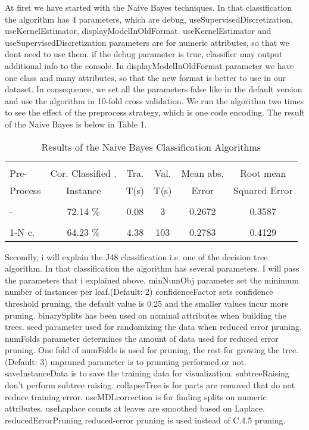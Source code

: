 \documentclass[a4paper]{article}
\begin{document}
At first we have started with the Naive Bayes techniques. In that classification the algorithm has 4 parameters, which are debug, useSupervisedDiscretization, useKernelEstimator, displayModelInOldFormat. useKernelEstimator and useSupervisedDiscretization parameters are for numeric attributes, so that we dont need to use them. if the debug parameter is true, classifier may output additional info to the console. In displayModelInOldFormat parameter we have one class and many attributes, so that the new format is better to use in our dataset. In consequence, we set all the parameters false like in the default version and use the algorithm in 10-fold cross validation. We run the algorithm two times to see the effect of the preprocess strategy, which is one code encoding. The result of the Naive Bayes is below in Table 1.

\begin{table}
\begin{tabular}{|l| c | c | c |c |c |}

\hline & & & & & \\
Pre- & Cor. Classified . & Tra. & Val. & Mean abs.  & Root mean \\
Process & Instance & T(s) &  T(s) & Error & Squared Error \\
\hline & & & & & \\
- &72.14  $\%$ & 0.08 & 3 &  0.2672 & 0.3587 \\ 
\hline & & & & & \\
1-N c. &64.23  $\%$ & 4.38 & 103 & 0.2783 & 0.4129 \\ 
\hline
\end{tabular}
\caption{Results of the Naive Bayes Classification Algorithms}
\end{table}

Secondly, i will explain the J48 classification i.e. one of the decision tree algorithm. In that classification the algorithm has several parameters. I will pass the parameters that i explained above. minNumObj parameter set the minimum number of instances per leaf.(Default: 2) confidenceFactor sets confidence threshold pruning, the default value is 0.25 and the smaller values incur more pruning. binarySplits has been used on nominal attributes when building the trees. seed parameter used for randomizing the data when reduced error pruning. numFolds parameter determines the amount of data used for reduced error pruning.  One fold of numFolds is used for pruning, the rest for growing the tree. (Default: 3) unpruned parameter is to prunning performed or not. saveInstanceData is to save the training data for visualization. subtreeRaising don't perform subtree raising. collapseTree is for parts are removed that do not reduce training error. useMDLcorrection is for finding splits on numeric attributes. useLaplace counts at leaves are smoothed based on Laplace. reducedErrorPruning reduced-error pruning is used instead of C.4.5 pruning. 
\end{document}
